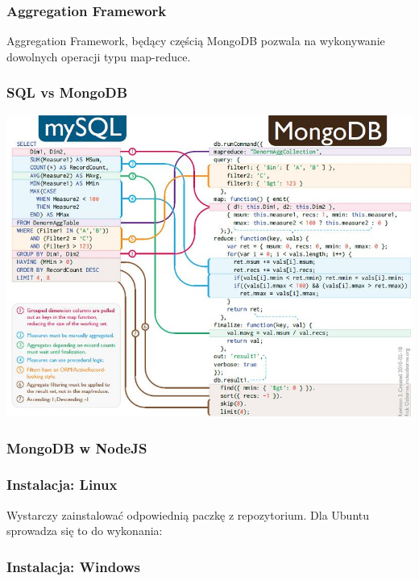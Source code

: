 \documentclass{beamer}
\begin{document}
  \begin{frame}
    \frametitle{Aggregation Framework}
    Aggregation Framework, będący częścią MongoDB pozwala na wykonywanie dowolnych operacji typu map-reduce.
  \end{frame}

  \begin{frame}
    \frametitle{SQL vs MongoDB}
    \includegraphics[width=\textwidth,keepaspectratio]{img/mysql_vs_mongodb.jpg}
  \end{frame}

  \begin{frame}
    \frametitle{MongoDB w NodeJS}
  \end{frame}

  \begin{frame}
    \frametitle{Instalacja: Linux}
    Wystarczy zainstalować odpowiednią paczkę z repozytorium. Dla Ubuntu sprowadza się to do wykonania:

    
  \end{frame}

  \begin{frame}
    \frametitle{Instalacja: Windows}
  \end{frame}
\end{document}
